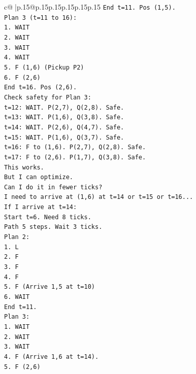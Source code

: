 \documentclass{article}
\begin{document}
{\begin{supertabular}{c@{$\;$}|p{.15\linewidth}@{}p{.15\linewidth}p{.15\linewidth}p{.15\linewidth}p{.15\linewidth}p{.15\linewidth}}
{{{\texttt{End t=11. Pos (1,5).} \\
\texttt{Plan 3 (t=11 to 16):} \\
\texttt{1. WAIT} \\
\texttt{2. WAIT} \\
\texttt{3. WAIT} \\
\texttt{4. WAIT} \\
\texttt{5. F (1,6) (Pickup P2)} \\
\texttt{6. F (2,6)} \\
\texttt{End t=16. Pos (2,6).} \\
\texttt{Check safety for Plan 3:} \\
\texttt{t=12: WAIT. P(2,7), Q(2,8). Safe.} \\
\texttt{t=13: WAIT. P(1,6), Q(3,8). Safe.} \\
\texttt{t=14: WAIT. P(2,6), Q(4,7). Safe.} \\
\texttt{t=15: WAIT. P(1,6), Q(3,7). Safe.} \\
\texttt{t=16: F to (1,6). P(2,7), Q(2,8). Safe.} \\
\texttt{t=17: F to (2,6). P(1,7), Q(3,8). Safe.} \\
\texttt{This works.} \\
\texttt{But I can optimize.} \\
\texttt{Can I do it in fewer ticks?} \\
\texttt{I need to arrive at (1,6) at t=14 or t=15 or t=16...} \\
\texttt{If I arrive at t=14:} \\
\texttt{Start t=6. Need 8 ticks.} \\
\texttt{Path 5 steps. Wait 3 ticks.} \\
\texttt{Plan 2:} \\
\texttt{1. L} \\
\texttt{2. F} \\
\texttt{3. F} \\
\texttt{4. F} \\
\texttt{5. F (Arrive 1,5 at t=10)} \\
\texttt{6. WAIT} \\
\texttt{End t=11.} \\
\texttt{Plan 3:} \\
\texttt{1. WAIT} \\
\texttt{2. WAIT} \\
\texttt{3. WAIT} \\
\texttt{4. F (Arrive 1,6 at t=14).} \\
\texttt{5. F (2,6)} \\
}}}
\end{supertabular}}
\end{document}
